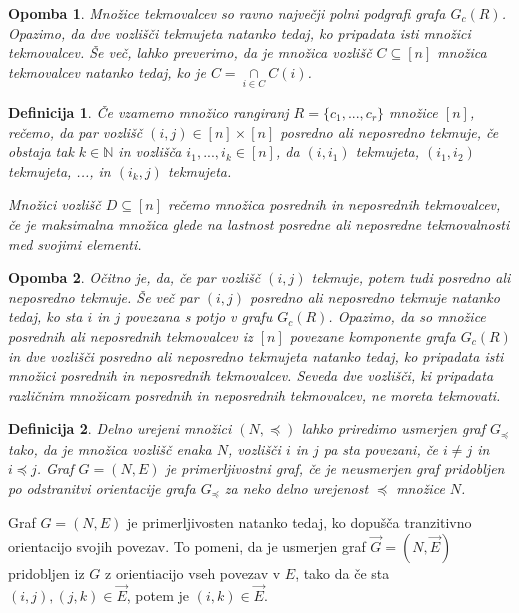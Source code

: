 \documentclass[a4paper, 12pt]{book}
\newtheorem{definicija}{Definicija}[chapter]
\newtheorem{opomba}{Opomba}[chapter]
\begin{document}
\begin{opomba}
    Množice tekmovalcev so ravno največji polni podgrafi grafa $G_c(R)$. Opazimo, da dve vozlišči tekmujeta natanko tedaj, ko pripadata isti množici tekmovalcev. Še več, lahko preverimo, da je množica vozlišč $C \subseteq [n]$ množica tekmovalcev natanko tedaj, ko je $C = \underset{i \in C}{\cap}C(i)$.
\end{opomba}

\begin{definicija}
    Če vzamemo množico rangiranj $R = \{ c_1, ..., c_r\}$ množice $[n]$, rečemo, da par vozlišč $(i, j) \in [n] \times [n]$ posredno ali neposredno tekmuje, če obstaja tak $k \in \mathbb{N}$ in vozlišča $i_1, ..., i_k \in [n]$, da $(i, i_1)$ tekmujeta, $(i_1, i_2)$ tekmujeta, ..., in $(i_k, j)$ tekmujeta.

    Množici vozlišč $D \subseteq [n]$ rečemo množica posrednih in neposrednih tekmovalcev, če je maksimalna množica glede na lastnost posredne ali neposredne tekmovalnosti med svojimi elementi.
\end{definicija}

\begin{opomba}
    Očitno je, da, če par vozlišč $(i, j)$ tekmuje, potem tudi posredno ali neposredno tekmuje. Še več par $(i, j)$ posredno ali neposredno tekmuje natanko tedaj, ko sta $i$ in $j$ povezana s potjo v grafu $G_c(R)$. Opazimo, da so množice posrednih ali neposrednih tekmovalcev iz $[n]$ povezane komponente grafa $G_c(R)$ in dve vozlišči posredno ali neposredno tekmujeta natanko tedaj, ko pripadata isti množici posrednih in neposrednih tekmovalcev. Seveda dve vozlišči, ki pripadata različnim množicam posrednih in neposrednih tekmovalcev, ne moreta tekmovati.
\end{opomba}

\begin{definicija}
    Delno urejeni množici $(N, \preceq)$ lahko priredimo usmerjen graf $G_{\preceq}$ tako, da je množica vozlišč enaka $N$, vozlišči $i$ in $j$ pa sta povezani, če $i \neq j$ in $i \preceq j$.
    Graf $G = (N, E)$ je primerljivostni graf, če je neusmerjen graf pridobljen po odstranitvi orientacije grafa $G_{\preceq}$ za neko delno urejenost $\preceq$  množice $N$.
\end{definicija}
Graf $G = (N, E)$ je primerljivosten natanko tedaj, ko dopušča tranzitivno orientacijo svojih povezav. To pomeni, da je usmerjen graf $\overset{\rightarrow}{G} = (N, \overset{\rightarrow}{E})$ pridobljen iz $G$ z orientiacijo vseh povezav v $E$, tako da če sta $(i, j), (j, k) \in \overset{\rightarrow}{E}$, potem je $(i, k) \in \overset{\rightarrow}{E}$.
\end{document}
